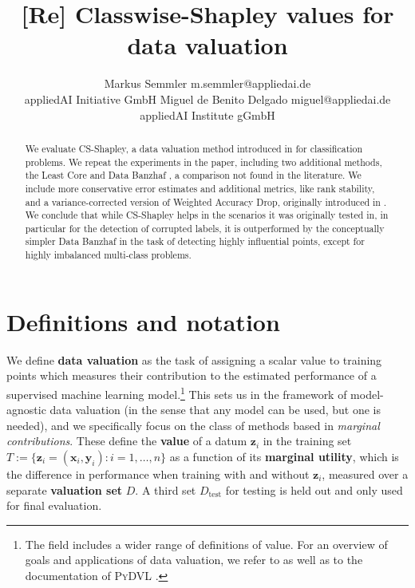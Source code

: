 \documentclass[10pt]{article}
\newcommand{\assign}{:=}
\newcommand{\tmdfn}[1]{\textbf{#1}}
\newcommand{\tmem}[1]{{\em #1\/}}
\newcommand{\tmmathbf}[1]{\ensuremath{\boldsymbol{#1}}}
\newcommand{\tmname}[1]{\textsc{#1}}
\newcommand{\tmop}[1]{\ensuremath{\operatorname{#1}}}
\begin{document}
\title{[Re] Classwise-Shapley values for data valuation}

\author{\name Markus Semmler \email m.semmler@appliedai.de \\
      \addr appliedAI Initiative GmbH
      \AND
      \name Miguel de Benito Delgado \email miguel@appliedai.de \\
      \addr appliedAI Institute gGmbH
      }

\maketitle

\begin{abstract}
  We evaluate CS-Shapley, a data valuation method introduced in
  {\cite{schoch_csshapley_2022}} for classification problems. We repeat the
  experiments in the paper, including two additional methods, the Least Core
  {\citep{yan_if_2021}} and Data Banzhaf {\citep{wang_data_2023}}, a
  comparison not found in the literature. We include more conservative error
  estimates and additional metrics, like rank stability, and a
  variance-corrected version of Weighted Accuracy Drop, originally introduced
  in {\cite{schoch_csshapley_2022}}. We conclude that while CS-Shapley helps
  in the scenarios it was originally tested in, in particular for the
  detection of corrupted labels, it is outperformed by the conceptually
  simpler Data Banzhaf in the task of detecting highly influential points,
  except for highly imbalanced multi-class problems.
\end{abstract}

\section{Definitions and notation}

We define {\tmdfn{data valuation}} as the task of assigning a scalar value to
training points which measures their contribution to the estimated performance
of a supervised machine learning model.\footnote{The field includes a wider
range of definitions of value. For an overview of goals and applications of
data valuation, we refer to {\cite{sim_data_2022}} as well as to the
documentation of {\tmname{PyDVL}} {\citep{transferlab_pydvl_2022}}.} This
sets us in the framework of model-agnostic data valuation (in the sense that
any model can be used, but one is needed), and we specifically focus on the
class of methods based in {\tmem{marginal contributions}}. These define the
{\tmdfn{value}} of a datum $\tmmathbf{z}_i$ in the training set $T \assign
\{\tmmathbf{z}_i = (\tmmathbf{x}_i, \tmmathbf{y}_i) : i = 1, \ldots, n\}$ as a
function of its {\tmdfn{marginal utility}}, which is the difference in
performance when training with and without $\tmmathbf{z}_i$, measured over a
separate {\tmdfn{valuation set}} $D$. A third set $D_{\tmop{test}}$ for
testing is held out and only used for final evaluation.
\end{document}
